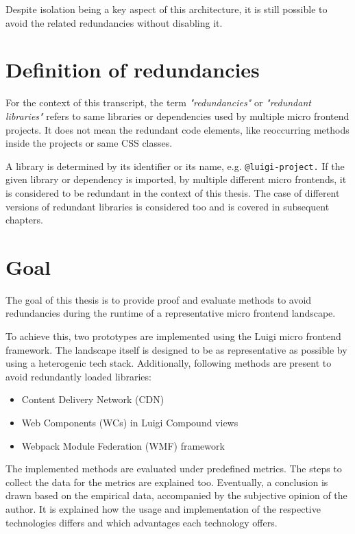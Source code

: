 Despite isolation being a key aspect of this architecture, it is still possible to avoid the related redundancies without disabling it.

\section{Definition of redundancies}

For the context of this transcript, the term \textit{"redundancies"} or \textit{"redundant libraries"} refers to same libraries or dependencies used by multiple micro frontend projects. It does not mean the redundant code elements, like reoccurring methods inside the projects or same CSS classes. 

A library is determined by its identifier or its name, e.g. \texttt{@luigi-project.} If the given library or dependency is imported, by multiple different micro frontends, it is considered to be redundant in the context of this thesis. The case of different versions of redundant libraries is considered too and is covered in subsequent chapters.

\section{Goal}

The goal of this thesis is to provide proof and evaluate methods to avoid redundancies during the runtime of a representative micro frontend landscape. 

To achieve this, two prototypes are implemented using the Luigi micro frontend framework. The landscape itself is designed to be as representative as possible by using a heterogenic tech stack. Additionally, following methods are present to avoid redundantly loaded libraries:

\begin{itemize}[noitemsep]
	\item Content Delivery Network (CDN)
	\item Web Components (WCs) in Luigi Compound views
	\item Webpack Module Federation (WMF) framework
\end{itemize}

The implemented methods are evaluated under predefined metrics. The steps to collect the data for the metrics are explained too.
Eventually, a conclusion is drawn based on the empirical data, accompanied by the subjective opinion of the author. It is explained how the usage and implementation of the respective technologies differs and which advantages each technology offers.
  
